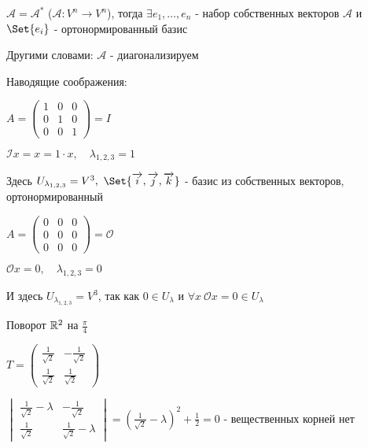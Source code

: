 \documentclass[12pt]{article}
\begin{document}
    \hypertarget{theoremabouteigenvectorsinselfconjugateoperator}{}

    \begin{MyTheorem}
        \Ths $\mathcal{A} = \mathcal{A}^*$ ($\mathcal{A} : V^n \to V^n$),
        тогда $\exists e_1, \dots, e_n$ - набор собственных векторов $\mathcal{A}$ и $\Set{e_i}$ - ортонормированный базис

        Другими словами: $\mathcal{A}$ - диагонализируем
    \end{MyTheorem}

    Наводящие соображения:

     $A = \begin{pmatrix}1 & 0 & 0 \\ 0 & 1 & 0 \\ 0 & 0 & 1\end{pmatrix} = I$

    $\mathcal{I}x = x = 1 \cdot x, \quad \lambda_{1,2,3} = 1$

    Здесь $U_{\lambda_{1,2,3}} = V^3, \ \Set{\overrightarrow{i}, \overrightarrow{j}, \overrightarrow{k}}$ - базис из собственных векторов, ортонормированный

     $A = \begin{pmatrix}0 & 0 & 0 \\ 0 & 0 & 0 \\ 0 & 0 & 0\end{pmatrix} = \mathcal{O}$

    $\mathcal{O}x = 0, \quad \lambda_{1,2,3} = 0$

    И здесь $U_{\lambda_{1,2,3}} = V^3$, так как $0 \in U_\lambda$ и $\forall x \ \mathcal{O}x = 0 \in U_\lambda$

     Поворот $\mathbb{R}^2$ на $\frac{\pi}{4}$

    $T = \begin{pmatrix}\frac{1}{\sqrt{2}} & -\frac{1}{\sqrt{2}} \\ \frac{1}{\sqrt{2}} & \frac{1}{\sqrt{2}}\end{pmatrix}$

    $\begin{vmatrix}\frac{1}{\sqrt{2}} - \lambda & -\frac{1}{\sqrt{2}} \\ \frac{1}{\sqrt{2}} & \frac{1}{\sqrt{2}} - \lambda\end{vmatrix} =
    \left(\frac{1}{\sqrt{2}} - \lambda\right)^2 + \frac{1}{2} = 0$ - вещественных корней нет

\end{document}
